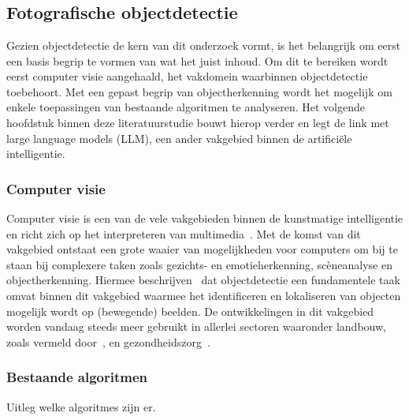 \chapter{}
\label{ch:stand-van-zaken}



\section{Fotografische objectdetectie}\label{sec:ls-object-detectie}
Gezien objectdetectie de kern van dit onderzoek vormt, is het belangrijk om eerst een basis begrip te vormen van wat het juist inhoud.
Om dit te bereiken wordt eerst computer visie aangehaald, het vakdomein waarbinnen objectdetectie toebehoort.
Met een gepast begrip van objectherkenning wordt het mogelijk om enkele toepassingen van bestaande algoritmen te analyseren.
Het volgende hoofdstuk binnen deze literatuurstudie bouwt hierop verder en legt de link met large language models (LLM), een ander vakgebied binnen de artifici\"ele intelligentie.

\subsection{Computer visie}\label{subsec:de-kern-van-objectdetectie}
Computer visie is een van de vele vakgebieden binnen de kunstmatige intelligentie en richt zich op het interpreteren van multimedia~\autocite{Moin2023}.
Met de komst van dit vakgebied ontstaat een grote waaier van mogelijkheden voor computers om bij te staan bij complexere taken zoals gezichts- en emotieherkenning, sc\`eneanalyse en objectherkenning.
Hiermee beschrijven~\textcite{Tasnim2023} dat objectdetectie een fundamentele taak omvat binnen dit vakgebied waarmee het identificeren en lokaliseren van objecten mogelijk wordt op (bewegende) beelden.
De ontwikkelingen in dit vakgebied worden vandaag steeds meer gebruikt in allerlei sectoren waaronder landbouw, zoals vermeld door~\textcite{Anand2024}, en gezondheidszorg~\autocite{Germanese2023}.

\subsection{Bestaande algoritmen}\label{subsec:bestaande-algoritmen}
Uitleg welke algoritmes zijn er.


